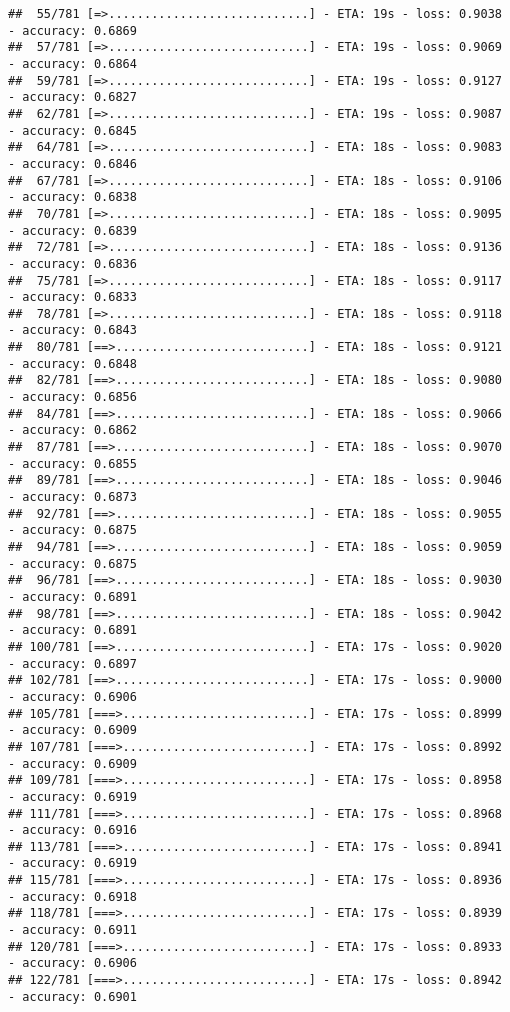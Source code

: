 \documentclass[
]{article}
\begin{document}
\begin{verbatim}
##  55/781 [=>............................] - ETA: 19s - loss: 0.9038 - accuracy: 0.6869
##  57/781 [=>............................] - ETA: 19s - loss: 0.9069 - accuracy: 0.6864
##  59/781 [=>............................] - ETA: 19s - loss: 0.9127 - accuracy: 0.6827
##  62/781 [=>............................] - ETA: 19s - loss: 0.9087 - accuracy: 0.6845
##  64/781 [=>............................] - ETA: 18s - loss: 0.9083 - accuracy: 0.6846
##  67/781 [=>............................] - ETA: 18s - loss: 0.9106 - accuracy: 0.6838
##  70/781 [=>............................] - ETA: 18s - loss: 0.9095 - accuracy: 0.6839
##  72/781 [=>............................] - ETA: 18s - loss: 0.9136 - accuracy: 0.6836
##  75/781 [=>............................] - ETA: 18s - loss: 0.9117 - accuracy: 0.6833
##  78/781 [=>............................] - ETA: 18s - loss: 0.9118 - accuracy: 0.6843
##  80/781 [==>...........................] - ETA: 18s - loss: 0.9121 - accuracy: 0.6848
##  82/781 [==>...........................] - ETA: 18s - loss: 0.9080 - accuracy: 0.6856
##  84/781 [==>...........................] - ETA: 18s - loss: 0.9066 - accuracy: 0.6862
##  87/781 [==>...........................] - ETA: 18s - loss: 0.9070 - accuracy: 0.6855
##  89/781 [==>...........................] - ETA: 18s - loss: 0.9046 - accuracy: 0.6873
##  92/781 [==>...........................] - ETA: 18s - loss: 0.9055 - accuracy: 0.6875
##  94/781 [==>...........................] - ETA: 18s - loss: 0.9059 - accuracy: 0.6875
##  96/781 [==>...........................] - ETA: 18s - loss: 0.9030 - accuracy: 0.6891
##  98/781 [==>...........................] - ETA: 18s - loss: 0.9042 - accuracy: 0.6891
## 100/781 [==>...........................] - ETA: 17s - loss: 0.9020 - accuracy: 0.6897
## 102/781 [==>...........................] - ETA: 17s - loss: 0.9000 - accuracy: 0.6906
## 105/781 [===>..........................] - ETA: 17s - loss: 0.8999 - accuracy: 0.6909
## 107/781 [===>..........................] - ETA: 17s - loss: 0.8992 - accuracy: 0.6909
## 109/781 [===>..........................] - ETA: 17s - loss: 0.8958 - accuracy: 0.6919
## 111/781 [===>..........................] - ETA: 17s - loss: 0.8968 - accuracy: 0.6916
## 113/781 [===>..........................] - ETA: 17s - loss: 0.8941 - accuracy: 0.6919
## 115/781 [===>..........................] - ETA: 17s - loss: 0.8936 - accuracy: 0.6918
## 118/781 [===>..........................] - ETA: 17s - loss: 0.8939 - accuracy: 0.6911
## 120/781 [===>..........................] - ETA: 17s - loss: 0.8933 - accuracy: 0.6906
## 122/781 [===>..........................] - ETA: 17s - loss: 0.8942 - accuracy: 0.6901

\end{verbatim}
\end{document}
